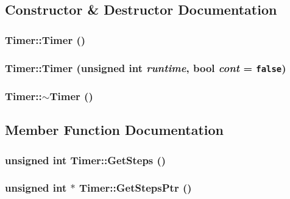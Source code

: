 \subsection{Constructor \& Destructor Documentation}
\hypertarget{class_timer_5f16e8da27d2a5a5242dead46de05d97}{
\subsubsection[{Timer}]{\setlength{\rightskip}{0pt plus 5cm}Timer::Timer ()}}
\label{class_timer_5f16e8da27d2a5a5242dead46de05d97}


\hypertarget{class_timer_eac46d188030ef2d2c8dabca19dd5b79}{
\subsubsection[{Timer}]{\setlength{\rightskip}{0pt plus 5cm}Timer::Timer (unsigned int {\em runtime}, \/  bool {\em cont} = {\tt false})}}
\label{class_timer_eac46d188030ef2d2c8dabca19dd5b79}


\hypertarget{class_timer_14fa469c4c295c5fa6e66a4ad1092146}{
\subsubsection[{$\sim$Timer}]{\setlength{\rightskip}{0pt plus 5cm}Timer::$\sim$Timer ()}}
\label{class_timer_14fa469c4c295c5fa6e66a4ad1092146}




\subsection{Member Function Documentation}
\hypertarget{class_timer_7138e307d4affcfaa1755ad3205c3a11}{
\subsubsection[{GetSteps}]{\setlength{\rightskip}{0pt plus 5cm}unsigned int Timer::GetSteps ()}}
\label{class_timer_7138e307d4affcfaa1755ad3205c3a11}


\hypertarget{class_timer_0c9c95ff67e7c2412f405e9ad1c774ee}{
\subsubsection[{GetStepsPtr}]{\setlength{\rightskip}{0pt plus 5cm}unsigned int $\ast$ Timer::GetStepsPtr ()}}
\label{class_timer_0c9c95ff67e7c2412f405e9ad1c774ee}


